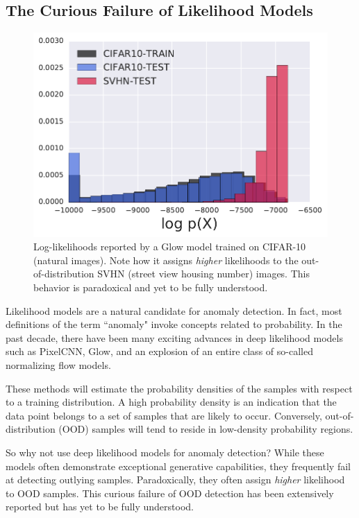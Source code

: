 \subsection*{The Curious Failure of Likelihood Models}

\begin{figure}[tbhp]
    \centering
     \includegraphics[width=.6\textwidth]{figures/cifar_glow_additive-tag_logprob_hist.pdf}
    \caption{Log-likelihoods reported by a Glow model trained on CIFAR-10 (natural images). Note how it assigns \textit{higher} likelihoods to the out-of-distribution SVHN (street view housing number) images. This behavior is paradoxical and yet to be fully understood.}
    \label{fig:cifar_glow}
\end{figure}

Likelihood models are a natural candidate for anomaly detection. In fact, most definitions of the term ``anomaly" invoke concepts related to probability. In the past decade, there have been many exciting advances in deep likelihood models such as PixelCNN, Glow, and an explosion of an entire class of so-called normalizing flow models.

These methods will estimate the probability densities of the samples with respect to a training distribution. A high probability density is an indication that the data point belongs to a set of samples that are likely to occur.
Conversely, out-of-distribution (OOD) samples will tend to reside in low-density probability regions.


So why not use deep likelihood models for anomaly detection? While these models often demonstrate exceptional generative capabilities, they frequently fail at detecting outlying samples. Paradoxically, they often assign \textit{higher} likelihood to OOD samples. This curious failure of OOD detection has been extensively reported \cite{nalisnick2018do,why_norm_fails,nalisnick2020detecting} but has yet to be fully understood.

